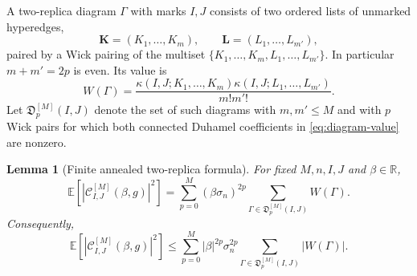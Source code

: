 \documentclass[11pt]{article}
\newtheorem{lemma}[theorem]{Lemma}
\newcommand{\E}{\mathbb{E}}
\newcommand{\R}{\mathbb{R}}
\begin{document}
A two-replica diagram $\Gamma$ with marks $I,J$ consists of two ordered lists of
unmarked hyperedges,
\begin{equation}\label{eq:two-replica-lists}
  \mathbf K=(K_1,
  \ldots,K_m),
  \qquad
  \mathbf L=(L_1,
  \ldots,L_{m'}),
\end{equation}
paired by a Wick pairing of the multiset
$\{K_1,
\ldots,K_m,L_1,
\ldots,L_{m'}\}$.  In particular $m+m'=2p$ is even.  Its value is
\begin{equation}\label{eq:diagram-value}
  W(\Gamma)
  =
  \frac{
    \kappa(I,J;K_1,
    \ldots,K_m)
    \kappa(I,J;L_1,
    \ldots,L_{m'})
  }{m!m'!}.
\end{equation}
Let $\mathfrak D_p^{[M]}(I,J)$ denote the set of such diagrams with
$m,m'\leq M$ and with $p$ Wick pairs for which both connected Duhamel
coefficients in \eqref{eq:diagram-value} are nonzero.

\begin{lemma}[Finite annealed two-replica formula]
  \label{lem:finite-two-replica-formula}
  For fixed $M,n,I,J$ and $\beta\in\R$,
  \begin{equation}\label{eq:finite-two-replica-formula}
    \E\left[
      \left|
        \mathcal C^{[M]}_{I,J}(\beta,g)
      \right|^2
    \right]
    =
    \sum_{p=0}^M
    (\beta\sigma_n)^{2p}
    \sum_{\Gamma\in\mathfrak D_p^{[M]}(I,J)}
    W(\Gamma).
  \end{equation}
  Consequently,
  \begin{equation}\label{eq:absolute-finite-two-replica-formula}
    \E\left[
      \left|
        \mathcal C^{[M]}_{I,J}(\beta,g)
      \right|^2
    \right]
    \leq
    \sum_{p=0}^M
    |\beta|^{2p}\sigma_n^{2p}
    \sum_{\Gamma\in\mathfrak D_p^{[M]}(I,J)}
    |W(\Gamma)|.
  \end{equation}
\end{lemma}
\end{document}
